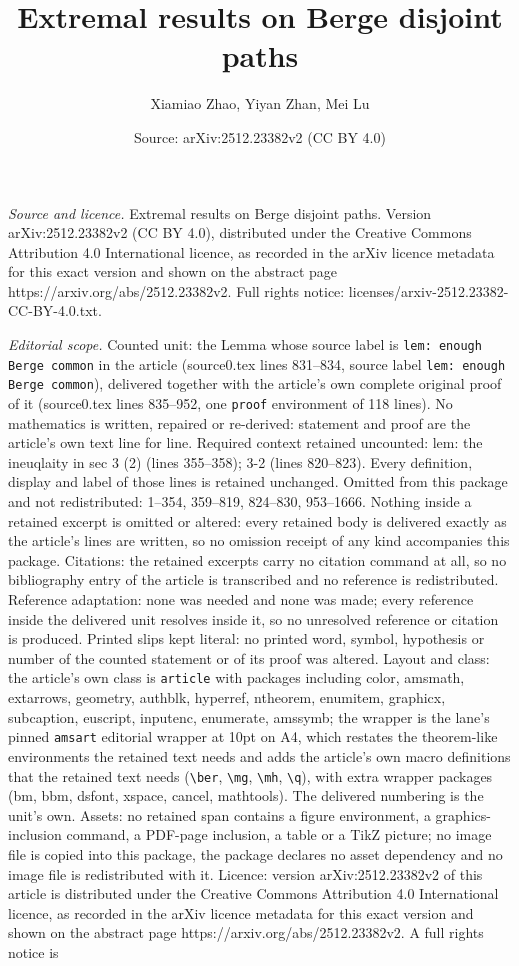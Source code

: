 \documentclass[10pt,a4paper]{amsart}
\title[Extremal results on Berge disjoint paths]{Extremal results on Berge disjoint paths}
\author{Xiamiao Zhao, Yiyan Zhan, Mei Lu}
\date{Source: arXiv:2512.23382v2 (CC BY 4.0)}
\begin{document}
\maketitle

\noindent\emph{Source and licence.} Extremal results on Berge disjoint paths. Version arXiv:2512.23382v2 (CC BY 4.0), distributed under the Creative Commons Attribution 4.0 International licence, as recorded in the arXiv licence metadata for this exact version and shown on the abstract page https://arxiv.org/abs/2512.23382v2. Full rights notice: licenses/arxiv-2512.23382-CC-BY-4.0.txt.\par\smallskip

\noindent\textit{Editorial scope.} Counted unit: the Lemma whose source label is \texttt{lem: enough Berge common} in the article (source0.tex lines 831--834, source label \texttt{lem: enough Berge common}), delivered together with the article's own complete original proof of it (source0.tex lines 835--952, one \texttt{proof} environment of 118 lines). No mathematics is written, repaired or re-derived: statement and proof are the article's own text line for line. Required context retained uncounted: lem: the ineuqlaity in sec 3 (2) (lines 355--358); 3-2 (lines 820--823). Every definition, display and label of those lines is retained unchanged. Omitted from this package and not redistributed: 1--354, 359--819, 824--830, 953--1666. Nothing inside a retained excerpt is omitted or altered: every retained body is delivered exactly as the article's lines are written, so no omission receipt of any kind accompanies this package. Citations: the retained excerpts carry no citation command at all, so no bibliography entry of the article is transcribed and no reference is redistributed. Reference adaptation: none was needed and none was made; every reference inside the delivered unit resolves inside it, so no unresolved reference or citation is produced. Printed slips kept literal: no printed word, symbol, hypothesis or number of the counted statement or of its proof was altered. Layout and class: the article's own class is \texttt{article} with packages including color, amsmath, extarrows, geometry, authblk, hyperref, ntheorem, enumitem, graphicx, subcaption, euscript, inputenc, enumerate, amssymb; the wrapper is the lane's pinned \texttt{amsart} editorial wrapper at 10pt on A4, which restates the theorem-like environments the retained text needs and adds the article's own macro definitions that the retained text needs (\texttt{\textbackslash ber}, \texttt{\textbackslash mg}, \texttt{\textbackslash mh}, \texttt{\textbackslash q}), with extra wrapper packages (bm, bbm, dsfont, xspace, cancel, mathtools). The delivered numbering is the unit's own. Assets: no retained span contains a figure environment, a graphics-inclusion command, a PDF-page inclusion, a table or a TikZ picture; no image file is copied into this package, the package declares no asset dependency and no image file is redistributed with it. Licence: version arXiv:2512.23382v2 of this article is distributed under the Creative Commons Attribution 4.0 International licence, as recorded in the arXiv licence metadata for this exact version and shown on the abstract page https://arxiv.org/abs/2512.23382v2. A full rights notice is 
\end{document}
